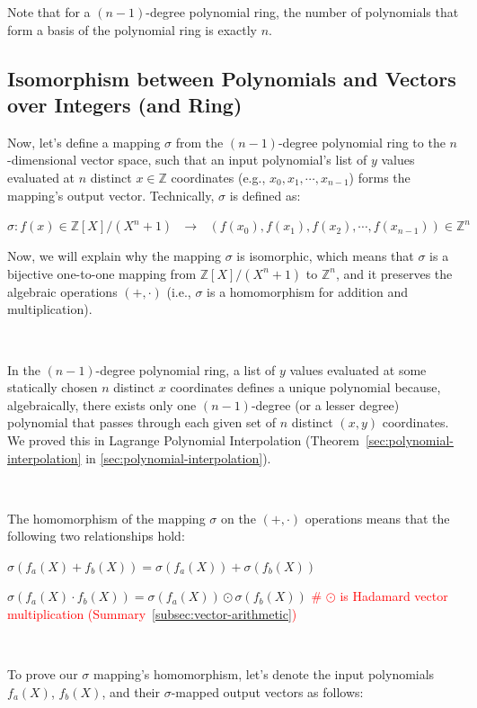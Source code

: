 Note that for a $(n-1)$-degree polynomial ring, the number of polynomials that form a basis of the polynomial ring is exactly $n$.


\subsection{Isomorphism between Polynomials and Vectors over Integers (and Ring)}
\label{subsec:poly-vector-transformation}



Now, let's define a mapping $\sigma$ from the $(n-1)$-degree polynomial ring to the $n$-dimensional vector space, such that an input polynomial's list of $y$ values evaluated at $n$ distinct $x \in \mathbb{Z}$ coordinates (e.g., $x_0, x_1, \cdots, x_{n-1}$) forms the mapping's output vector. Technically, $\sigma$ is defined as:

$\sigma: f(x) \in \mathbb{Z}[X] / (X^n + 1) \text{ } \longrightarrow \text{ } (f(x_0), f(x_1), f(x_2), \cdots, f(x_{n-1})) \in \mathbb{Z}^n$

Now, we will explain why the mapping $\sigma$ is isomorphic, which means that $\sigma$ is a bijective one-to-one mapping from $\mathbb{Z}[X] / (X^n + 1)$ to $\mathbb{Z}^n$, and it preserves the algebraic operations $(+, \cdot)$ (i.e., $\sigma$ is a homomorphism for addition and multiplication).

$ $

 In the $(n-1)$-degree polynomial ring, a list of $y$ values evaluated at some statically chosen $n$ distinct $x$ coordinates defines a unique polynomial because, algebraically, there exists only one $(n-1)$-degree (or a lesser degree) polynomial that passes through each given set of $n$ distinct $(x, y)$ coordinates. We proved this in Lagrange Polynomial Interpolation (Theorem~\ref*{sec:polynomial-interpolation} in \autoref{sec:polynomial-interpolation}). 

$ $

 The homomorphism of the mapping $\sigma$ on the $(+, \cdot)$ operations means that the following two relationships hold: 

$\sigma(f_a(X) + f_b(X)) = \sigma(f_a(X)) + \sigma(f_b(X))$

$\sigma(f_a(X) \cdot f_b(X)) = \sigma(f_a(X)) \odot \sigma(f_b(X))$ \textcolor{red}{\text{ } \# $\odot$ is Hadamard vector multiplication (Summary~\ref*{subsec:vector-arithmetic})}

$ $

To prove our $\sigma$ mapping's homomorphism, let's denote the input polynomials $f_a(X)$, $f_b(X)$, and their $\sigma$-mapped output vectors as follows:


